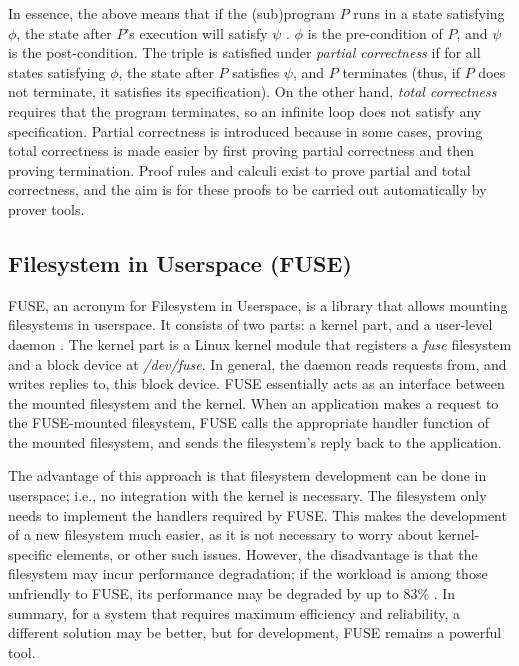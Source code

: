 In essence, the above means that if the (sub)program $P$ runs in a state satisfying $\phi$, the state after $P$'s execution will satisfy $\psi$ \cite{huth2004}.
$\phi$ is the pre-condition of $P$, and $\psi$ is the post-condition.
The triple is satisfied under \textit{partial correctness} if for all states satisfying $\phi$, the state after $P$ satisfies $\psi$, and $P$ terminates (thus, if $P$ does not terminate, it satisfies its specification).
On the other hand, \textit{total correctness} requires that the program terminates, so an infinite loop does not satisfy any specification.
Partial correctness is introduced because in some cases, proving total correctness is made easier by first proving partial correctness and then proving termination.
Proof rules and calculi exist to prove partial and total correctness, and the aim is for these proofs to be carried out automatically by prover tools.

\subsection{Filesystem in Userspace (FUSE)}
FUSE, an acronym for Filesystem in Userspace, is a library that allows mounting filesystems in userspace.
It consists of two parts: a kernel part, and a user-level daemon \cite{vangoor2017}.
The kernel part is a Linux kernel module that registers a \textit{fuse} filesystem and a block device at \textit{/dev/fuse}.
In general, the daemon reads requests from, and writes replies to, this block device.
FUSE essentially acts as an interface between the mounted filesystem and the kernel.
When an application makes a request to the FUSE-mounted filesystem, FUSE calls the appropriate handler function of the mounted filesystem, and sends the filesystem's reply back to the application.

The advantage of this approach is that filesystem development can be done in userspace; i.e., no integration with the kernel is necessary.
The filesystem only needs to implement the handlers required by FUSE.
This makes the development of a new filesystem much easier, as it is not necessary to worry about kernel-specific elements, or other such issues.
However, the disadvantage is that the filesystem may incur performance degradation; if the workload is among those unfriendly to FUSE, its performance may be degraded by up to 83\% \cite{vangoor2017}.
In summary, for a system that requires maximum efficiency and reliability, a different solution may be better, but for development, FUSE remains a powerful tool.
